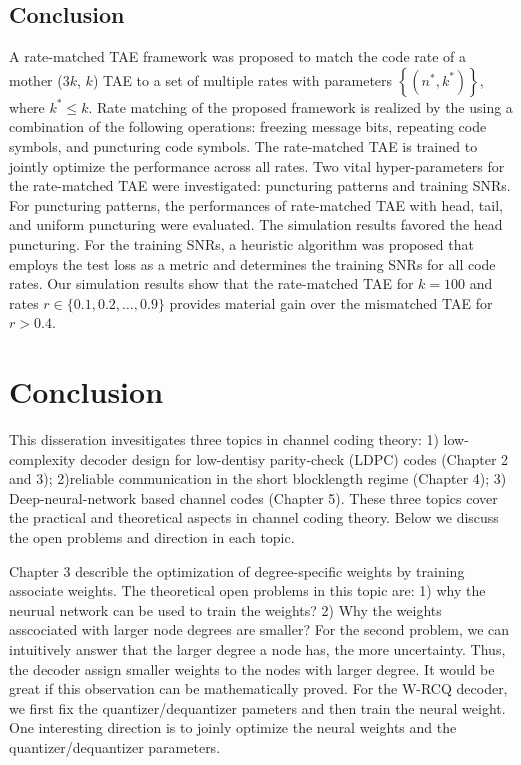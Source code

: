 \documentclass [PhD] {uclathes}
\begin{document}
\section{Conclusion}\label{sec: conclusion_5}
A rate-matched TAE framework was proposed to match the code rate of a mother ($3k$, $k$) TAE to a set of multiple rates with parameters $\left\{(n^*,k^*)\right\}$, where $k^*\leq k$. Rate matching of the proposed framework is realized by the using a combination of the following operations: freezing message bits, repeating code symbols, and puncturing code symbols. The rate-matched TAE is trained to jointly optimize the performance across all rates. 
Two vital hyper-parameters for the rate-matched TAE were investigated: puncturing patterns and training SNRs. For puncturing patterns, the performances of rate-matched TAE with head, tail, and uniform puncturing were evaluated. The simulation results favored the head puncturing. For the training SNRs, a heuristic algorithm was proposed that employs the test loss as a metric and determines the training SNRs for all code rates.  Our simulation results show that the rate-matched TAE for $k=100$ and rates $r\in \{0.1,0.2,\ldots,0.9\}$ provides material gain over the mismatched TAE for $r>0.4$.

\chapter{Conclusion} \label{cpt: Con}
This disseration invesitigates three topics in channel coding theory: 1) low-complexity decoder design for low-dentisy parity-check (LDPC) codes (Chapter 2 and 3); 2)reliable communication in the short blocklength regime  (Chapter 4); 3) Deep-neural-network based channel codes (Chapter 5). These three topics cover the practical and theoretical aspects in channel coding theory. Below we discuss the open problems and direction in each topic.

Chapter 3 describle the optimization of degree-specific weights by training associate weights. The theoretical open problems in this topic are: 1) why the neurual network can be used to train the weights? 2) Why the weights asscociated with larger node degrees are smaller? For the second problem, we can intuitively answer that the larger degree a node has, the more uncertainty. Thus, the decoder assign smaller weights to the nodes with larger degree. It would be great if this observation can be mathematically proved. For the W-RCQ decoder, we first fix the quantizer/dequantizer pameters and then train the neural weight. One interesting direction is to joinly optimize the neural weights and the quantizer/dequantizer parameters.
\end{document}
